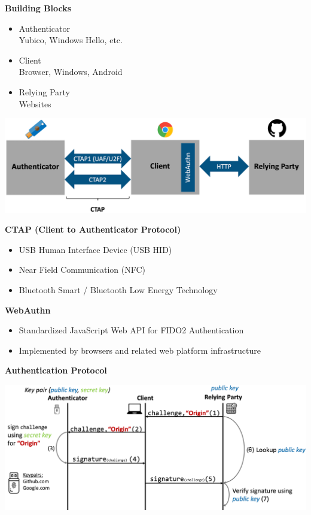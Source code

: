 \textbf{Building Blocks}
\begin{itemize}
    \item Authenticator\\
    Yubico, Windows Hello, etc.
    \item Client\\
    Browser, Windows, Android
    \item Relying Party\\
    Websites
\end{itemize}
\begin{center}
    \vspace{-8pt}
    \includegraphics[width=1.0\linewidth]{./img/09-mitm/fido2_building_blocks}
    \vspace{-8pt}
\end{center}

\textbf{CTAP (Client to Authenticator Protocol)}
\begin{itemize}
    \item USB Human Interface Device (USB HID)
    \item Near Field Communication (NFC)
    \item Bluetooth Smart / Bluetooth Low Energy Technology
\end{itemize}

\textbf{WebAuthn}
\begin{itemize}
    \item Standardized JavaScript Web API for FIDO2 Authentication
    \item Implemented by browsers and related web platform infrastructure
\end{itemize}
\textbf{Authentication Protocol}
\begin{center}
    \vspace{-8pt}
    \includegraphics[width=1.0\linewidth]{./img/09-mitm/fido2_proto}
    \vspace{-8pt}
\end{center}

